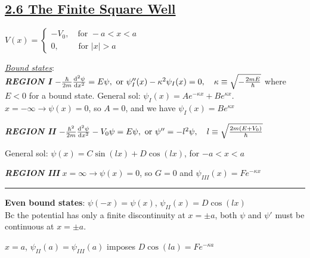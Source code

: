 \subsection{\underline{2.6 The Finite Square Well}}
$V(x) = 
\begin{cases}
    -V_{0}, \quad \textrm{for } -a < x < a &\\
    0, \qquad \textrm{ for } |x| > a &
\end{cases}$



\textit{\underline{Bound states}}: \\

\textbf{\textit{REGION I}}
$-\frac{\hbar}{2m} \dv[2]{\psi}{x} = E \psi, \textrm{ or } \psi''_{I}(x) - \kappa^2 \psi_{I}(x) = 0, \quad \kappa \equiv \sqrt{-\frac{2mE}{\hbar}}$
where $E < 0$ for a bound state. 
General sol: $\psi_{I}(x) = Ae^{-\kappa x} + B e^{\kappa x}$. \\
$x = -\infty \rightarrow \psi(x) = 0$, so $A = 0$, and we have $\psi_{I}(x) = Be^{\kappa x}$

\smallskip

\textbf{\textit{REGION II}}
$-\frac{\hbar^2}{2m} \dv[2]{\psi}{x} - V_0 \psi = E \psi, \textrm{ or } \psi'' = -l^2 \psi, \quad l \equiv \sqrt{\frac{2m (E + V_0)}{\hbar}}$

General sol: $\psi(x) = C \sin(lx) + D \cos(lx)$, for $-a < x < a$

\smallskip

\textbf{\textit{REGION III}} 
$x = \infty \rightarrow \psi(x) = 0$, so $G=0$ and $\psi_{III}(x) = Fe^{-\kappa x}$

\medskip
\hrule height 0.3pt \thinspace

\textbf{Even bound states}:
$\psi(-x) = \psi(x)$, $\psi_{II}(x) = D \cos(lx)$ \\
Bc the potential has only a finite discontinuity at $x = \pm a$, both $\psi$ and $\psi'$ must be continuous at $x = \pm a$.

$x = a$, $\psi_{II}(a) = \psi_{III}(a)$ imposes $D \cos(la) = F e^{-\kappa a}$ \\


